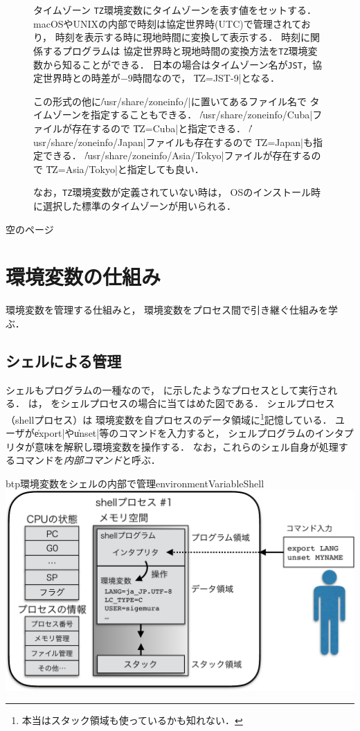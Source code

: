 \begin{figure}[btp]
\begin{itembox}[l]{タイムゾーン}
\texttt{TZ}環境変数にタイムゾーンを表す値をセットする．
macOSやUNIXの内部で時刻は協定世界時(UTC)で管理されており，
時刻を表示する時に現地時間に変換して表示する．
時刻に関係するプログラムは
協定世界時と現地時間の変換方法を\texttt{TZ}環境変数から知ることができる．
日本の場合はタイムゾーン名が\texttt{JST}，協定世界時との時差が$-9$時間なので，
\|TZ=JST-9|となる．

この形式の他に\|/usr/share/zoneinfo/|に置いてあるファイル名で
タイムゾーンを指定することもできる．
\|/usr/share/zoneinfo/Cuba|ファイルが存在するので
\|TZ=Cuba|と指定できる．
\|/usr/share/zoneinfo/Japan|ファイルも存在するので
\|TZ=Japan|も指定できる．
\|/usr/share/zoneinfo/Asia/Tokyo|ファイルが存在するので
\|TZ=Asia/Tokyo|と指定しても良い．

なお，\texttt{TZ}環境変数が定義されていない時は，
OSのインストール時に選択した標準のタイムゾーンが用いられる．
\end{itembox}
\end{figure}

\newpage
空のページ
\newpage
\section{環境変数の仕組み}
環境変数を管理する仕組みと，
環境変数をプロセス間で引き継ぐ仕組みを学ぶ．

\subsection{シェルによる管理}
シェルもプログラムの一種なので，
に示したようなプロセスとして実行される．
は，
をシェルプロセスの場合に当てはめた図である．
シェルプロセス（shellプロセス）は
環境変数を自プロセスのデータ領域に\footnote{
本当はスタック領域も使っているかも知れない．}記憶している．
ユーザが\|export|や\|unset|等のコマンドを入力すると，
シェルプログラムのインタプリタが意味を解釈し環境変数を操作する．
なお，これらのシェル自身が処理するコマンドを\emph{内部コマンド}と呼ぶ．

\begin{myfig}{btp}{環境変数をシェルの内部で管理}{environmentVariableShell}
  \includegraphics[scale=0.70]{Fig/environmentVariableShell-crop.pdf}
\end{myfig}

